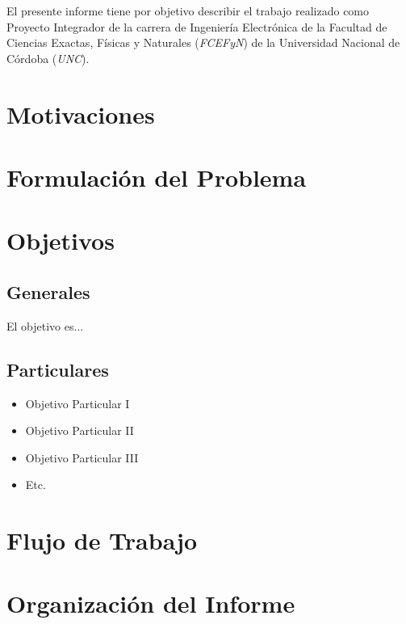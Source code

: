 \documentclass[../main.tex]{subfiles}
\begin{document}
El presente informe tiene por objetivo describir el trabajo realizado como Proyecto Integrador de la carrera de Ingeniería Electrónica de la Facultad de Ciencias Exactas, Físicas y Naturales (\textit{FCEFyN}) de la Universidad Nacional de Córdoba (\textit{UNC}).


\blindtext %

\section{Motivaciones}
\label{ss:motiv}
\Blindtext %

\section{Formulación del Problema}
\Blindtext %

\section{Objetivos}
\subsection{Generales}
El objetivo es...
\blindtext %

\subsection{Particulares}
\begin {itemize}
\item Objetivo Particular I
\item Objetivo Particular II
\item Objetivo Particular III
\item Etc.
\end{itemize}

\section{Flujo de Trabajo}
\Blindtext %
	
\section{Organización del Informe}
\Blindtext %
	
\end{document}
